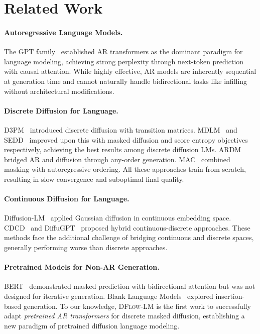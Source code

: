 \documentclass{article}
\newcommand{\ours}{\textsc{DFlow-LM}}
\begin{document}
\section{Related Work}
\label{sec:related}

\paragraph{Autoregressive Language Models.}
The GPT family~\citep{radford2019language, brown2020language} established AR transformers as the dominant paradigm for language modeling, achieving strong perplexity through next-token prediction with causal attention.
While highly effective, AR models are inherently sequential at generation time and cannot naturally handle bidirectional tasks like infilling without architectural modifications.

\paragraph{Discrete Diffusion for Language.}
D3PM~\citep{austin2021structured} introduced discrete diffusion with transition matrices.
MDLM~\citep{sahoo2024simple} and SEDD~\citep{lou2024discrete} improved upon this with masked diffusion and score entropy objectives respectively, achieving the best results among discrete diffusion LMs.
ARDM~\citep{hoogeboom2022autoregressive} bridged AR and diffusion through any-order generation.
MAC~\citep{shi2024simplified} combined masking with autoregressive ordering.
All these approaches train from scratch, resulting in slow convergence and suboptimal final quality.

\paragraph{Continuous Diffusion for Language.}
Diffusion-LM~\citep{li2022diffusion} applied Gaussian diffusion in continuous embedding space.
CDCD~\citep{dieleman2022continuous} and DiffuGPT~\citep{gong2024diffugpt} proposed hybrid continuous-discrete approaches.
These methods face the additional challenge of bridging continuous and discrete spaces, generally performing worse than discrete approaches.

\paragraph{Pretrained Models for Non-AR Generation.}
BERT~\citep{devlin2019bert} demonstrated masked prediction with bidirectional attention but was not designed for iterative generation.
Blank Language Models~\citep{shen2020blank} explored insertion-based generation.
To our knowledge, \ours{} is the first work to successfully adapt \emph{pretrained AR transformers} for discrete masked diffusion, establishing a new paradigm of pretrained diffusion language modeling.
\end{document}
